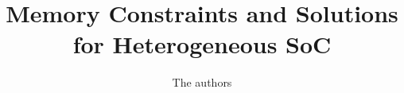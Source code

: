 \documentclass[12pt,journal,compsoc]{IEEEtran}
\begin{document}
%
\title{Memory Constraints and Solutions \\ for Heterogeneous SoC}
%
%
%
%

\author{The authors}

% 
%
\end{document}
